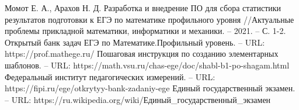 \begin{thebibliography}{5}
	 Момот Е. А., Арахов Н. Д. Разработка и внедрение ПО для сбора статистики результатов подготовки к ЕГЭ по математике профильного уровня //Актуальные проблемы прикладной математики, информатики и механики. – 2021. – С. 1-2.
	Открытый банк задач ЕГЭ по Математике.Профильный уровень. – URL:  https://prof.mathege.ru/
	Пошаговая инструкция по созданию элементарных шаблонов. – URL:  https://math.vsu.ru/chas-ege/doc/shabl-b1-po-shagam.html
	Федеральный институт педагогических измерений. – URL:  https://fipi.ru/ege/otkrytyy-bank-zadaniy-ege
	 Единый государственный экзамен. – URL:  https://ru.wikipedia.org/wiki/Единый\_государственный\_экзамен
\end{thebibliography}